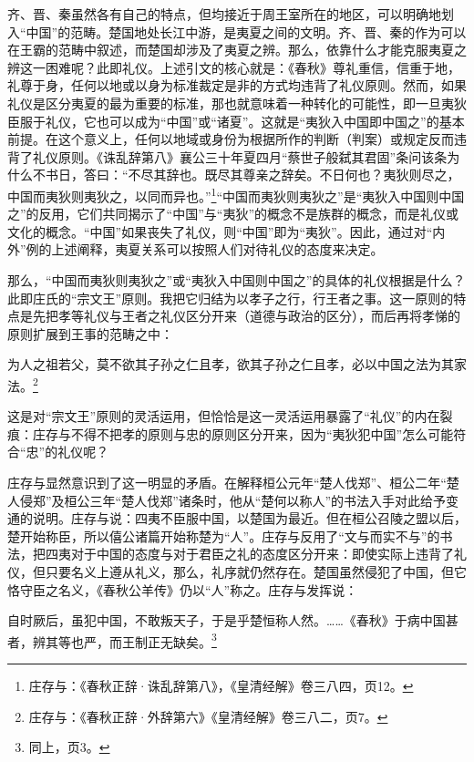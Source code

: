 \documentclass[a4paper, 12pt, openright]{ctexbook}
\renewenvironment{quote}
  {\list{}{\rightmargin2\ccwd \leftmargin2\ccwd \itemindent=2\ccwd \listparindent=2\ccwd}%
   \item\relax\small\kaishu\color{black}}
  {\endlist}
\begin{document}
齐、晋、秦虽然各有自己的特点，但均接近于周王室所在的地区，可以明确地划入“中国”的范畴。楚国地处长江中游，是夷夏之间的文明。齐、晋、秦的作为可以在王霸的范畴中叙述，而楚国却涉及了夷夏之辨。那么，依靠什么才能克服夷夏之辨这一困难呢？此即礼仪。上述引文的核心就是：《春秋》尊礼重信，信重于地，礼尊于身，任何以地或以身为标准裁定是非的方式均违背了礼仪原则。然而，如果礼仪是区分夷夏的最为重要的标准，那也就意味着一种转化的可能性，即一旦夷狄臣服于礼仪，它也可以成为“中国”或“诸夏”。这就是“夷狄入中国即中国之”的基本前提。在这个意义上，任何以地域或身份为根据所作的判断（判案）或规定反而违背了礼仪原则。《诛乱辞第八》襄公三十年夏四月“蔡世子般弑其君固”条问该条为什么不书日，答曰：“不尽其辞也。既尽其尊亲之辞矣。不日何也？夷狄则尽之，中国而夷狄则夷狄之，以同而异也。”\footnote{庄存与：《春秋正辞·诛乱辞第八》，《皇清经解》卷三八四，页12。}“中国而夷狄则夷狄之”是“夷狄入中国则中国之”的反用，它们共同揭示了“中国”与“夷狄”的概念不是族群的概念，而是礼仪或文化的概念。“中国”如果丧失了礼仪，则“中国”即为“夷狄”。因此，通过对“内外”例的上述阐释，夷夏关系可以按照人们对待礼仪的态度来决定。

那么，“中国而夷狄则夷狄之”或“夷狄入中国则中国之”的具体的礼仪根据是什么？此即庄氏的“宗文王”原则。我把它归结为以孝子之行，行王者之事。这一原则的特点是先把孝等礼仪与王者之礼仪区分开来（道德与政治的区分），而后再将孝悌的原则扩展到王事的范畴之中：

\begin{quote}
为人之祖若父，莫不欲其子孙之仁且孝，欲其子孙之仁且孝，必以中国之法为其家法。\footnote{庄存与：《春秋正辞·外辞第六》《皇清经解》卷三八二，页7。}
\end{quote}

这是对“宗文王”原则的灵活运用，但恰恰是这一灵活运用暴露了“礼仪”的内在裂痕：庄存与不得不把孝的原则与忠的原则区分开来，因为“夷狄犯中国”怎么可能符合“忠”的礼仪呢？

庄存与显然意识到了这一明显的矛盾。在解释桓公元年“楚人伐郑”、桓公二年“楚人侵郑”及桓公三年“楚人伐郑”诸条时，他从“楚何以称人”的书法入手对此给予变通的说明。庄存与说：四夷不臣服中国，以楚国为最近。但在桓公召陵之盟以后，楚开始称臣，所以僖公诸篇开始称楚为“人”。庄存与反用了“文与而实不与”的书法，把四夷对于中国的态度与对于君臣之礼的态度区分开来：即使实际上违背了礼仪，但只要名义上遵从礼义，那么，礼序就仍然存在。楚国虽然侵犯了中国，但它恪守臣之名义，《春秋公羊传》仍以“人”称之。庄存与发挥说：

\begin{quote}
自时厥后，虽犯中国，不敢叛天子，于是乎楚恒称人然。……《春秋》于病中国甚者，辨其等也严，而王制正无缺矣。\footnote{同上，页3。}
\end{quote}
\end{document}
